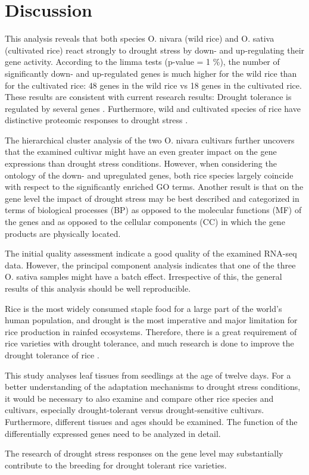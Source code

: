 \section{Discussion}

This analysis reveals that both species O. nivara (wild rice) and O. sativa (cultivated rice) react strongly to drought stress by down- and up-regulating their gene activity. According to the limma tests (p-value = 1 \%), the number of significantly down- and up-regulated genes is much higher for the wild rice than for the cultivated rice: 48 genes in the wild rice vs 18 genes in the cultivated rice. These results are consistent with current research results: Drought tolerance is regulated by several genes \autocite{10.3389/fpls.2016.01029}. Furthermore, wild and cultivated species of rice have distinctive proteomic responses to drought stress \autocite{10.3390/ijms21175980}.

The hierarchical cluster analysis of the two O. nivara cultivars further uncovers that the examined cultivar might have an even greater impact on the gene expressions than drought stress conditions. However, when considering the ontology of the down- and upregulated genes, both rice species largely coincide with respect to the significantly enriched GO terms. Another result is that on the gene level the impact of drought stress may be best described and categorized in terms of biological processes (BP) as opposed to the molecular functions (MF) of the genes and as opposed to the cellular components (CC) in which the gene products are physically located.

The initial quality assessment indicate a good quality of the examined RNA-seq data. However, the principal component analysis indicates that one of the three O. sativa samples might have a batch effect. Irrespective of this, the general results of this analysis should be well reproducible.

Rice is the most widely consumed staple food for a large part of the world's human population, and drought is the most imperative and major limitation for rice production in rainfed ecosystems. Therefore, there is a great requirement of rice varieties with drought tolerance, and much research is done to improve the drought tolerance of rice \autocite{10.1016/j.rsci.2021.01.002}.

This study analyses leaf tissues from seedlings at the age of twelve days. For a better understanding of the adaptation mechanisms to drought stress conditions, it would be necessary to also examine and compare other rice species and cultivars, especially drought-tolerant versus drought-sensitive cultivars. Furthermore, different tissues and ages should be examined. The function of the differentially expressed genes need to be analyzed in detail.

The research of drought stress responses on the gene level may substantially contribute to the breeding for drought tolerant rice varieties.